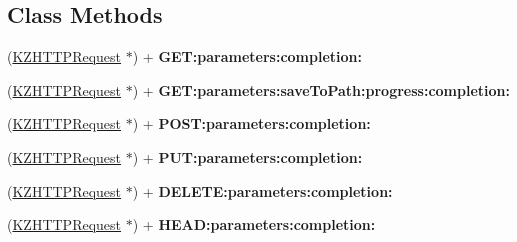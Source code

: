 \subsection*{Class Methods}
\begin{DoxyCompactItemize}
\item 
\hypertarget{interface_k_z_h_t_t_p_request_a77db6b32bb329c43a2bb9b6b03c1e8d0}{(\hyperlink{interface_k_z_h_t_t_p_request}{K\-Z\-H\-T\-T\-P\-Request} $\ast$) + {\bfseries G\-E\-T\-:parameters\-:completion\-:}}\label{interface_k_z_h_t_t_p_request_a77db6b32bb329c43a2bb9b6b03c1e8d0}

\item 
\hypertarget{interface_k_z_h_t_t_p_request_a83cb80c4374582ecf8b00f45925d31a1}{(\hyperlink{interface_k_z_h_t_t_p_request}{K\-Z\-H\-T\-T\-P\-Request} $\ast$) + {\bfseries G\-E\-T\-:parameters\-:save\-To\-Path\-:progress\-:completion\-:}}\label{interface_k_z_h_t_t_p_request_a83cb80c4374582ecf8b00f45925d31a1}

\item 
\hypertarget{interface_k_z_h_t_t_p_request_a6c330cdf1fe0ebbe00034890856e8c84}{(\hyperlink{interface_k_z_h_t_t_p_request}{K\-Z\-H\-T\-T\-P\-Request} $\ast$) + {\bfseries P\-O\-S\-T\-:parameters\-:completion\-:}}\label{interface_k_z_h_t_t_p_request_a6c330cdf1fe0ebbe00034890856e8c84}

\item 
\hypertarget{interface_k_z_h_t_t_p_request_a072ae56ccd21e9db08e97a36afa66801}{(\hyperlink{interface_k_z_h_t_t_p_request}{K\-Z\-H\-T\-T\-P\-Request} $\ast$) + {\bfseries P\-U\-T\-:parameters\-:completion\-:}}\label{interface_k_z_h_t_t_p_request_a072ae56ccd21e9db08e97a36afa66801}

\item 
\hypertarget{interface_k_z_h_t_t_p_request_a8e46eb449bdb1d01ceab7e67dd93f258}{(\hyperlink{interface_k_z_h_t_t_p_request}{K\-Z\-H\-T\-T\-P\-Request} $\ast$) + {\bfseries D\-E\-L\-E\-T\-E\-:parameters\-:completion\-:}}\label{interface_k_z_h_t_t_p_request_a8e46eb449bdb1d01ceab7e67dd93f258}

\item 
\hypertarget{interface_k_z_h_t_t_p_request_ad069a245c4ef2ca5f5ba73d3086baa59}{(\hyperlink{interface_k_z_h_t_t_p_request}{K\-Z\-H\-T\-T\-P\-Request} $\ast$) + {\bfseries H\-E\-A\-D\-:parameters\-:completion\-:}}\label{interface_k_z_h_t_t_p_request_ad069a245c4ef2ca5f5ba73d3086baa59}

\end{DoxyCompactItemize}
